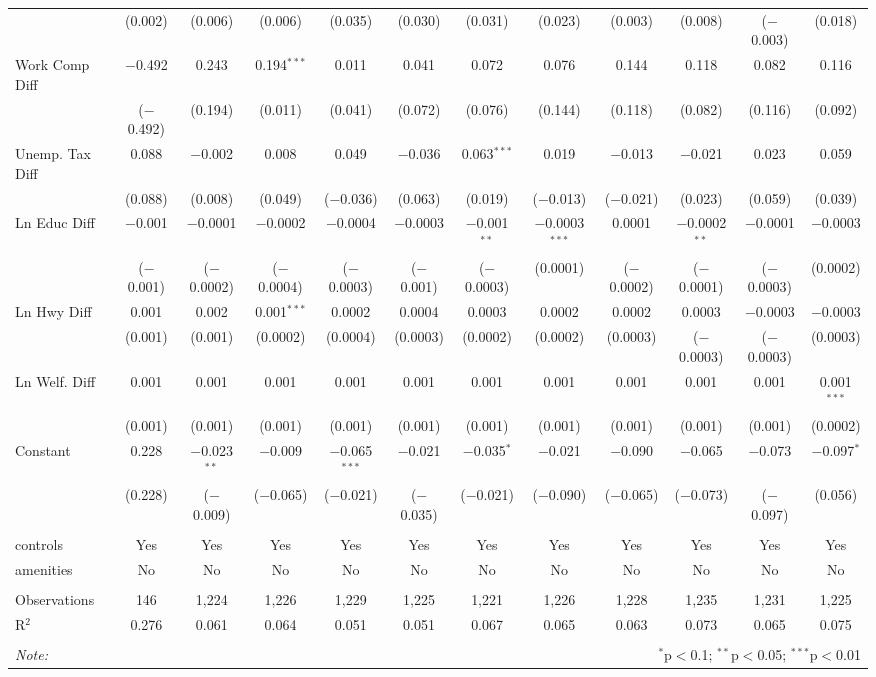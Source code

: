 \begin{table}[!htbp]
\begin{tabular}{@{\extracolsep{5pt}}lccccccccccc}
  & (0.002) & (0.006) & (0.006) & (0.035) & (0.030) & (0.031) & (0.023) & (0.003) & (0.008) & ($-$0.003) & (0.018) \\ 
  Work Comp Diff & $-$0.492 & 0.243 & 0.194$^{***}$ & 0.011 & 0.041 & 0.072 & 0.076 & 0.144 & 0.118 & 0.082 & 0.116 \\ 
  & ($-$0.492) & (0.194) & (0.011) & (0.041) & (0.072) & (0.076) & (0.144) & (0.118) & (0.082) & (0.116) & (0.092) \\ 
  Unemp. Tax Diff & 0.088 & $-$0.002 & 0.008 & 0.049 & $-$0.036 & 0.063$^{***}$ & 0.019 & $-$0.013 & $-$0.021 & 0.023 & 0.059 \\ 
  & (0.088) & (0.008) & (0.049) & ($-$0.036) & (0.063) & (0.019) & ($-$0.013) & ($-$0.021) & (0.023) & (0.059) & (0.039) \\ 
  Ln Educ Diff & $-$0.001 & $-$0.0001 & $-$0.0002 & $-$0.0004 & $-$0.0003 & $-$0.001$^{**}$ & $-$0.0003$^{***}$ & 0.0001 & $-$0.0002$^{**}$ & $-$0.0001 & $-$0.0003 \\ 
  & ($-$0.001) & ($-$0.0002) & ($-$0.0004) & ($-$0.0003) & ($-$0.001) & ($-$0.0003) & (0.0001) & ($-$0.0002) & ($-$0.0001) & ($-$0.0003) & (0.0002) \\ 
  Ln Hwy Diff & 0.001 & 0.002 & 0.001$^{***}$ & 0.0002 & 0.0004 & 0.0003 & 0.0002 & 0.0002 & 0.0003 & $-$0.0003 & $-$0.0003 \\ 
  & (0.001) & (0.001) & (0.0002) & (0.0004) & (0.0003) & (0.0002) & (0.0002) & (0.0003) & ($-$0.0003) & ($-$0.0003) & (0.0003) \\ 
  Ln Welf. Diff & 0.001 & 0.001 & 0.001 & 0.001 & 0.001 & 0.001 & 0.001 & 0.001 & 0.001 & 0.001 & 0.001$^{***}$ \\ 
  & (0.001) & (0.001) & (0.001) & (0.001) & (0.001) & (0.001) & (0.001) & (0.001) & (0.001) & (0.001) & (0.0002) \\ 
  Constant & 0.228 & $-$0.023$^{**}$ & $-$0.009 & $-$0.065$^{***}$ & $-$0.021 & $-$0.035$^{*}$ & $-$0.021 & $-$0.090 & $-$0.065 & $-$0.073 & $-$0.097$^{*}$ \\ 
  & (0.228) & ($-$0.009) & ($-$0.065) & ($-$0.021) & ($-$0.035) & ($-$0.021) & ($-$0.090) & ($-$0.065) & ($-$0.073) & ($-$0.097) & (0.056) \\ 
 \hline \\[-1.8ex] 
controls & Yes & Yes & Yes & Yes & Yes & Yes & Yes & Yes & Yes & Yes & Yes \\ 
amenities & No & No & No & No & No & No & No & No & No & No & No \\ 
\hline \\[-1.8ex] 
Observations & 146 & 1,224 & 1,226 & 1,229 & 1,225 & 1,221 & 1,226 & 1,228 & 1,235 & 1,231 & 1,225 \\ 
R$^{2}$ & 0.276 & 0.061 & 0.064 & 0.051 & 0.051 & 0.067 & 0.065 & 0.063 & 0.073 & 0.065 & 0.075 \\ 
\hline 
\hline \\[-1.8ex] 
\textit{Note:}  & \multicolumn{11}{r}{$^{*}$p$<$0.1; $^{**}$p$<$0.05; $^{***}$p$<$0.01} \\ 
\end{tabular} 
\end{table} 
